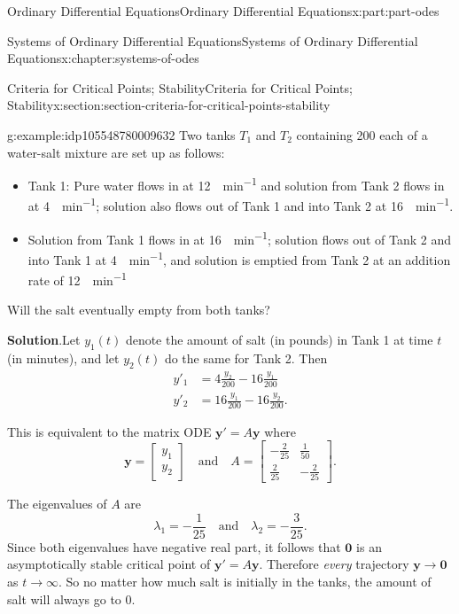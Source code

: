 \documentclass[oneside,10pt,]{book}
\newcommand{\blocktitlefont}{\relax}
\numberwithin{equation}{part}
\renewcommand{\vec}[1]{\mathbf{#1}}
\newcommand{\amp}{&}
\begin{document}
\begin{partptx}{Ordinary Differential Equations}{}{Ordinary Differential Equations}{}{}{x:part:part-odes}
\begin{chapterptx}{Systems of Ordinary Differential Equations}{}{Systems of Ordinary Differential Equations}{}{}{x:chapter:systems-of-odes}
\begin{sectionptx}{Criteria for Critical Points; Stability}{}{Criteria for Critical Points; Stability}{}{}{x:section:section-criteria-for-critical-points-stability}
\begin{example}{}{g:example:idp105548780009632}%
Two tanks \(T_{1}\) and \(T_{2}\) containing \SI{200}{\gallon} each of a water-salt mixture are set up as follows:%
%
\begin{itemize}[label=\textbullet]
\item{}Tank 1: Pure water flows in at \SI{12}{\gallon\per\minute} and solution from Tank 2 flows in at \SI{4}{\gallon\per\minute}; solution also flows out of Tank 1 and into Tank 2 at \SI{16}{\gallon\per\minute}.%
\item{}Solution from Tank 1 flows in at \SI{16}{\gallon\per\minute}; solution flows out of Tank 2 and into Tank 1 at \SI{4}{\gallon\per\minute}, and solution is emptied from Tank 2 at an addition rate of \SI{12}{\gallon\per\minute}%
\end{itemize}
Will the salt eventually empty from both tanks?%
\par\smallskip%
\noindent\textbf{\blocktitlefont Solution}.\hypertarget{g:solution:idp105548780019488}{}\quad{}Let \(y_{1}(t)\) denote the amount of salt (in pounds) in Tank 1 at time \(t\) (in minutes), and let \(y_{2}(t)\) do the same for Tank 2. Then%
\begin{align*}
y'_{1}  \amp =  4\frac{y_{2}}{200} - 16\frac{y_{1}}{200}\\
y'_{2}  \amp =  16\frac{y_{1}}{200} - 16\frac{y_{2}}{200}\text{.}
\end{align*}
%
\par
This is equivalent to the matrix ODE \(\vec{y}' = A\vec{y}\) where%
\begin{equation*}
\vec{y} = \begin{bmatrix}y_{1}\\y_{2}\end{bmatrix}\quad\text{and}\quad A = \begin{bmatrix}-\frac{2}{25} \amp  \frac{1}{50} \\ \frac{2}{25} \amp  -\frac{2}{25}\end{bmatrix}.
\end{equation*}
%
\par
The eigenvalues of \(A\) are%
\begin{equation*}
\lambda_{1} = -\frac{1}{25}\quad\text{and}\quad\lambda_{2} = -\frac{3}{25}.
\end{equation*}
Since both eigenvalues have negative real part, it follows that \(\vec{0}\) is an asymptotically stable critical point of \(\vec{y}'=A\vec{y}\). Therefore \emph{every} trajectory \(\vec{y}\to\vec{0}\) as \(t\to\infty\). So no matter how much salt is initially in the tanks, the amount of salt will always go to \(0\).%

\end{example}
\end{sectionptx}
\end{chapterptx}
\end{partptx}
\end{document}
